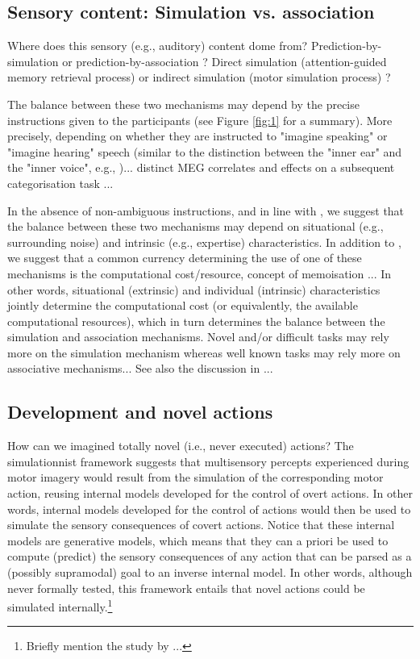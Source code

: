 \documentclass[utf8]{template/frontiersSCNS} %
\begin{document}
\subsection{Sensory content: Simulation vs. association}

Where does this sensory (e.g., auditory) content dome from? Prediction-by-simulation or prediction-by-association \citep{pickering_integrated_2013}? Direct simulation (attention-guided memory retrieval process) or indirect simulation (motor simulation process) \citep{tian_mental_2012, tian_effect_2013, li_corollary_2020, ma_distinct_2019}?

The balance between these two mechanisms may depend by the precise instructions given to the participants (see Figure \ref{fig:1} for a summary). More precisely, depending on whether they are instructed to "imagine speaking" or "imagine hearing" speech (similar to the distinction between the "inner ear" and the "inner voice", e.g., \cite{smith_subvocalization_1992})... distinct MEG correlates and effects on a subsequent categorisation task \citep{ma_distinct_2019}...

In the absence of non-ambiguous instructions, and in line with \cite{tian_mental_2012}, we suggest that the balance between these two mechanisms may depend on situational (e.g., surrounding noise) and intrinsic (e.g., expertise) characteristics. In addition to \cite{tian_mental_2012}, we suggest that a common currency determining the use of one of these mechanisms is the computational cost/resource, concept of memoisation \citep{dasgupta_memory_2021}... In other words, situational (extrinsic) and individual (intrinsic) characteristics jointly determine the computational cost (or equivalently, the available computational resources), which in turn determines the balance between the simulation and association mechanisms. Novel and/or difficult tasks may rely more on the simulation mechanism whereas well known tasks may rely more on associative mechanisms... See also the discussion in  \citep{nalborczyk_understanding_2019-1, nalborczyk_re-analysing_2020}...

\subsection{Development and novel actions}

How can we imagined totally novel (i.e., never executed) actions? The simulationnist framework suggests that multisensory percepts experienced during motor imagery would result from the simulation of the corresponding motor action, reusing internal models developed for the control of overt actions. In other words, internal models developed for the control of actions would then be used to simulate the sensory consequences of covert actions. Notice that these internal models are generative models, which means that they can a priori be used to compute (predict) the sensory consequences of any action that can be parsed as a (possibly supramodal) goal to an inverse internal model. In other words, although never formally tested, this framework entails that novel actions could be simulated internally.\footnote{Briefly mention the study by \cite{mulder_role_2004}...}
\end{document}
